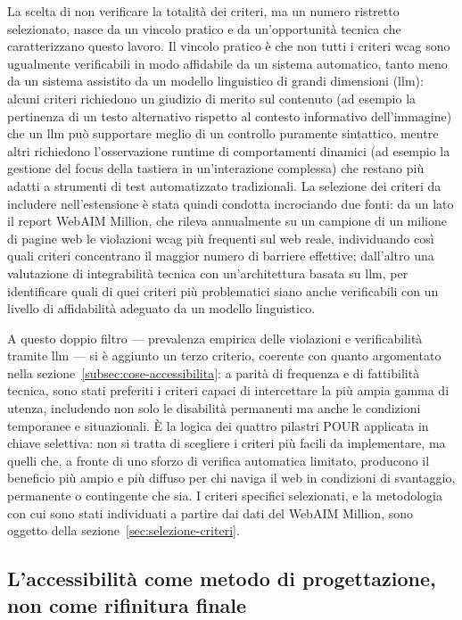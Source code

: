 La scelta di non verificare la totalità dei criteri, ma un numero ristretto selezionato, nasce da un vincolo pratico e da un'opportunità tecnica che caratterizzano questo lavoro. Il vincolo pratico è che non tutti i criteri \gls{wcag} sono ugualmente verificabili in modo affidabile da un sistema automatico, tanto meno da un sistema assistito da un modello linguistico di grandi dimensioni (\gls{llm}): alcuni criteri richiedono un giudizio di merito sul contenuto (ad esempio la pertinenza di un testo alternativo rispetto al contesto informativo dell'immagine) che un \gls{llm} può supportare meglio di un controllo puramente sintattico, mentre altri richiedono l'osservazione runtime di comportamenti dinamici (ad esempio la gestione del focus della tastiera in un'interazione complessa) che restano più adatti a strumenti di test automatizzato tradizionali. La selezione dei criteri da includere nell'estensione è stata quindi condotta incrociando due fonti: da un lato il report WebAIM Million, che rileva annualmente su un campione di un milione di pagine web le violazioni \gls{wcag} più frequenti sul web reale, individuando così quali criteri concentrano il maggior numero di barriere effettive; dall'altro una valutazione di integrabilità tecnica con un'architettura basata su \gls{llm}, per identificare quali di quei criteri più problematici siano anche verificabili con un livello di affidabilità adeguato da un modello linguistico.

A questo doppio filtro --- prevalenza empirica delle violazioni e verificabilità tramite \gls{llm} --- si è aggiunto un terzo criterio, coerente con quanto argomentato nella sezione~\ref{subsec:cose-accessibilita}: a parità di frequenza e di fattibilità tecnica, sono stati preferiti i criteri capaci di intercettare la più ampia gamma di utenza, includendo non solo le disabilità permanenti ma anche le condizioni temporanee e situazionali. È la logica dei quattro pilastri POUR applicata in chiave selettiva: non si tratta di scegliere i criteri più facili da implementare, ma quelli che, a fronte di uno sforzo di verifica automatica limitato, producono il beneficio più ampio e più diffuso per chi naviga il web in condizioni di svantaggio, permanente o contingente che sia. I criteri specifici selezionati, e la metodologia con cui sono stati individuati a partire dai dati del WebAIM Million, sono oggetto della sezione~\ref{sec:selezione-criteri}.


\subsection{L'accessibilità come metodo di progettazione, non come rifinitura finale}
\label{subsec:accessibilita-by-design}

